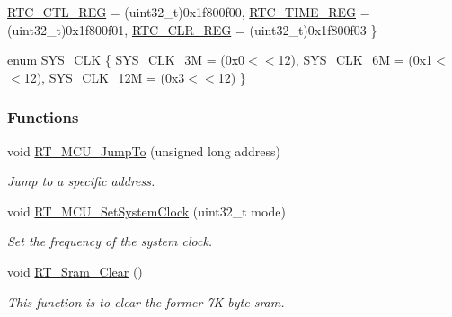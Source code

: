 \begin{DoxyCompactItemize}
\mbox{\hyperlink{a00020_adadaa0ab1ebbd7ba9b70dfd24c3ed44dac218ded0714563f03f40814bf16da7c7}{R\+T\+C\+\_\+\+C\+T\+L\+\_\+\+R\+EG}} = (uint32\+\_\+t)0x1f800f00, 
\mbox{\hyperlink{a00020_adadaa0ab1ebbd7ba9b70dfd24c3ed44daf375f171cb828ab3d87d45724750256d}{R\+T\+C\+\_\+\+T\+I\+M\+E\+\_\+\+R\+EG}} = (uint32\+\_\+t)0x1f800f01, 
\newline
\mbox{\hyperlink{a00020_adadaa0ab1ebbd7ba9b70dfd24c3ed44dabc51699db6321ee7f233162735869f70}{R\+T\+C\+\_\+\+C\+L\+R\+\_\+\+R\+EG}} = (uint32\+\_\+t)0x1f800f03
 \}
\item 
enum \mbox{\hyperlink{a00020_ae3a2d501b8662e11b969fb4a5e195e5b}{S\+Y\+S\+\_\+\+C\+LK}} \{ \mbox{\hyperlink{a00020_ae3a2d501b8662e11b969fb4a5e195e5baaac7754daa9ff2db35951f3539495122}{S\+Y\+S\+\_\+\+C\+L\+K\+\_\+3M}} = (0x0$<$$<$12), 
\mbox{\hyperlink{a00020_ae3a2d501b8662e11b969fb4a5e195e5bad1640aa8c46162a7551abca12293ef39}{S\+Y\+S\+\_\+\+C\+L\+K\+\_\+6M}} = (0x1$<$$<$12), 
\mbox{\hyperlink{a00020_ae3a2d501b8662e11b969fb4a5e195e5ba6c646c9a1e4c38ef0af6d576eacfb401}{S\+Y\+S\+\_\+\+C\+L\+K\+\_\+12M}} = (0x3$<$$<$12)
 \}
\end{DoxyCompactItemize}
\subsubsection*{Functions}
\begin{DoxyCompactItemize}
\item 
void \mbox{\hyperlink{a00020_aa106e3c9181a65a83156bda31f4f61e9}{R\+T\+\_\+\+M\+C\+U\+\_\+\+Jump\+To}} (unsigned long address)
\begin{DoxyCompactList}\small\item\em Jump to a specific address. \end{DoxyCompactList}\item 
void \mbox{\hyperlink{a00020_a1e578ce669735935a1d505c0edf98221}{R\+T\+\_\+\+M\+C\+U\+\_\+\+Set\+System\+Clock}} (uint32\+\_\+t mode)
\begin{DoxyCompactList}\small\item\em Set the frequency of the system clock. \end{DoxyCompactList}\item 
void \mbox{\hyperlink{a00020_ad514417aa2e5a5d061a5eabeceae20c6}{R\+T\+\_\+\+Sram\+\_\+\+Clear}} ()
\begin{DoxyCompactList}\small\item\em This function is to clear the former 7\+K-\/byte sram. \end{DoxyCompactList}\end{DoxyCompactItemize}


